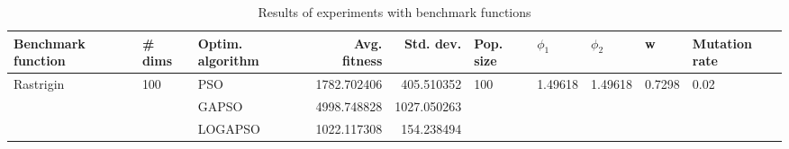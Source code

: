 \begin{table}
\centering
\caption{Results of experiments with benchmark functions}
\begin{tabular}{lllrrlllll}
\toprule
        Benchmark function &              \# dims & Optim. algorithm &  Avg. fitness &   Std. dev. &            Pop. size &               $\phi_{1}$ &               $\phi_{2}$ &                       w &         Mutation rate \\
\midrule
\multirow{3}{*}{Rastrigin} & \multirow{3}{*}{100} &              PSO &   1782.702406 &  405.510352 & \multirow{3}{*}{100} & \multirow{3}{*}{1.49618} & \multirow{3}{*}{1.49618} & \multirow{3}{*}{0.7298} & \multirow{3}{*}{0.02} \\
                           &                      &            GAPSO &   4998.748828 & 1027.050263 &                      &                          &                          &                         &                       \\
                           &                      &          LOGAPSO &   1022.117308 &  154.238494 &                      &                          &                          &                         &                       \\
\bottomrule
\end{tabular}
\end{table}
